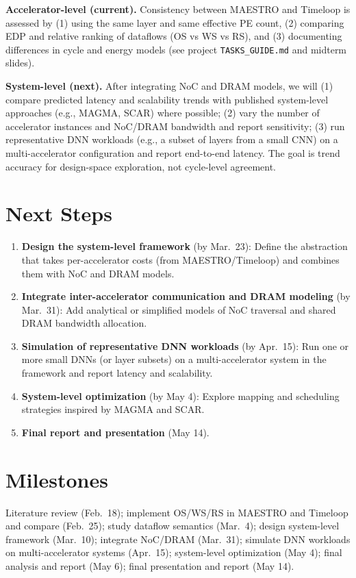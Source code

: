 \documentclass[10pt,sigconf,nonacm]{acmart}
\begin{document}
\textbf{Accelerator-level (current).} Consistency between MAESTRO and Timeloop is assessed by (1) using the same layer and same effective PE count, (2) comparing EDP and relative ranking of dataflows (OS vs WS vs RS), and (3) documenting differences in cycle and energy models (see project \texttt{TASKS\_GUIDE.md} and midterm slides).

\textbf{System-level (next).} After integrating NoC and DRAM models, we will (1) compare predicted latency and scalability trends with published system-level approaches (e.g., MAGMA, SCAR) where possible; (2) vary the number of accelerator instances and NoC/DRAM bandwidth and report sensitivity; (3) run representative DNN workloads (e.g., a subset of layers from a small CNN) on a multi-accelerator configuration and report end-to-end latency. The goal is trend accuracy for design-space exploration, not cycle-level agreement.

\section{Next Steps}
\label{sec:next}

\begin{enumerate}
  \item \textbf{Design the system-level framework} (by Mar.\ 23): Define the abstraction that takes per-accelerator costs (from MAESTRO/Timeloop) and combines them with NoC and DRAM models.
  \item \textbf{Integrate inter-accelerator communication and DRAM modeling} (by Mar.\ 31): Add analytical or simplified models of NoC traversal and shared DRAM bandwidth allocation.
  \item \textbf{Simulation of representative DNN workloads} (by Apr.\ 15): Run one or more small DNNs (or layer subsets) on a multi-accelerator system in the framework and report latency and scalability.
  \item \textbf{System-level optimization} (by May 4): Explore mapping and scheduling strategies inspired by MAGMA and SCAR.
  \item \textbf{Final report and presentation} (May 14).
\end{enumerate}

\section{Milestones}
\label{sec:milestones}

Literature review (Feb.\ 18); implement OS/WS/RS in MAESTRO and Timeloop and compare (Feb.\ 25); study dataflow semantics (Mar.\ 4); design system-level framework (Mar.\ 10); integrate NoC/DRAM (Mar.\ 31); simulate DNN workloads on multi-accelerator systems (Apr.\ 15); system-level optimization (May 4); final analysis and report (May 6); final presentation and report (May 14).



\end{document}
